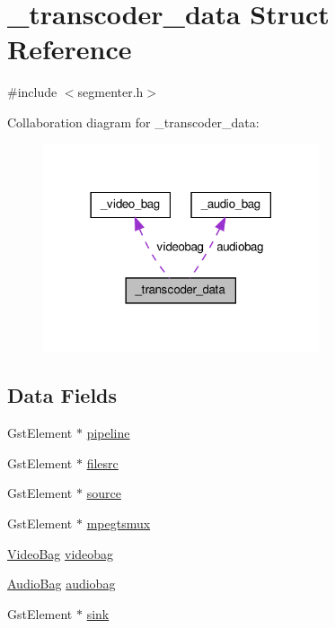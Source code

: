 \hypertarget{struct__transcoder__data}{\section{\-\_\-transcoder\-\_\-data \-Struct \-Reference}
\label{struct__transcoder__data}
}


{\ttfamily \#include $<$segmenter.\-h$>$}



\-Collaboration diagram for \-\_\-transcoder\-\_\-data\-:
\nopagebreak
\begin{figure}[H]
\begin{center}
\leavevmode
\includegraphics[width=230pt]{struct__transcoder__data__coll__graph}
\end{center}
\end{figure}
\subsection*{\-Data \-Fields}
\begin{DoxyCompactItemize}
\item 
\-Gst\-Element $\ast$ \hyperlink{struct__transcoder__data_a310ff227733a8a01cb68a9af5e132751}{pipeline}
\item 
\-Gst\-Element $\ast$ \hyperlink{struct__transcoder__data_a650b27f093557fcea9f53f432c7724cf}{filesrc}
\item 
\-Gst\-Element $\ast$ \hyperlink{struct__transcoder__data_a258d0be8d8f4992e7579e31c12e06078}{source}
\item 
\-Gst\-Element $\ast$ \hyperlink{struct__transcoder__data_aa67a91cfc1bc02fc307178ef4f35df14}{mpegtsmux}
\item 
\hyperlink{segmenter_8h_a6f94543709a46b063bd7fb0817acfe0e}{\-Video\-Bag} \hyperlink{struct__transcoder__data_aceb5b4e8609bbec3bf57e52a7f4d865a}{videobag}
\item 
\hyperlink{segmenter_8h_a91a772b808e575d8b4da9b8e9f3c8cfc}{\-Audio\-Bag} \hyperlink{struct__transcoder__data_a27c753df9dd609802e4649f4be7e64e7}{audiobag}
\item 
\-Gst\-Element $\ast$ \hyperlink{struct__transcoder__data_a92b8e1a70279c8c57514246bcea2a6c0}{sink}
\end{DoxyCompactItemize}


